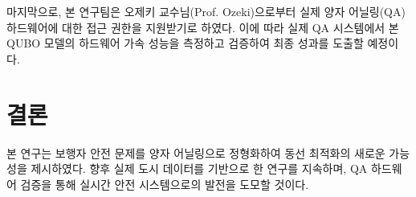 \documentclass[11pt,a4paper]{article}
\begin{document}
마지막으로, 본 연구팀은 오제키 교수님(Prof. Ozeki)으로부터 실제
양자 어닐링(QA) 하드웨어에 대한 접근 권한을 지원받기로 하였다.
이에 따라 실제 QA 시스템에서 본 QUBO 모델의 하드웨어 가속 성능을
측정하고 검증하여 최종 성과를 도출할 예정이다.

\section{결론}
본 연구는 보행자 안전 문제를 양자 어닐링으로 정형화하여 동선 최적화의
새로운 가능성을 제시하였다.
향후 실제 도시 데이터를 기반으로 한 연구를 지속하며, QA 하드웨어 검증을
통해 실시간 안전 시스템으로의 발전을 도모할 것이다.



\end{document}
